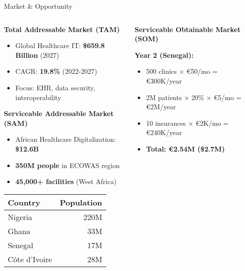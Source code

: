 \documentclass[aspectratio=169,xcolor=dvipsnames,20pt]{beamer}
\begin{document}
\begin{frame}{Market \& Opportunity}

  \begin{columns}[T]
    \begin{column}{0.5\textwidth}
      \textbf{\textcolor{FadjmaBlue}{Total Addressable Market (TAM)}}
      \begin{itemize}
        \item Global Healthcare IT: \textbf{\$659.8 Billion} (2027)
        \item CAGR: \textbf{19.8\%} (2022-2027)
        \item Focus: EHR, data security, interoperability
      \end{itemize}

      \vspace{0.3cm}

      \textbf{\textcolor{FadjmaBlue}{Serviceable Addressable Market (SAM)}}
      \begin{itemize}
        \item African Healthcare Digitalization: \textbf{\$12.6B}
        \item \textbf{350M people} in ECOWAS region
        \item \textbf{45,000+ facilities} (West Africa)
      \end{itemize}

      \begin{table}
        \scriptsize
        \begin{tabular}{lr}
          \toprule
          \textbf{Country} & \textbf{Population} \\
          \midrule
          Nigeria & 220M \\
          Ghana & 33M \\
          Senegal & 17M \\
          Côte d'Ivoire & 28M \\
          \bottomrule
        \end{tabular}
      \end{table}
    \end{column}

    \begin{column}{0.5\textwidth}
      \textbf{\textcolor{FadjmaBlue}{Serviceable Obtainable Market (SOM)}}

      \textbf{Year 2 (Senegal):}
      \begin{itemize}
        \item 500 clinics × €50/mo = €300K/year
        \item 2M patients × 20\% × €5/mo = €2M/year
        \item 10 insurances × €2K/mo = €240K/year
        \item \textbf{Total: €2.54M (\$2.7M)}
      \end{itemize}


\end{column}
\end{columns}
\end{frame}
\end{document}
